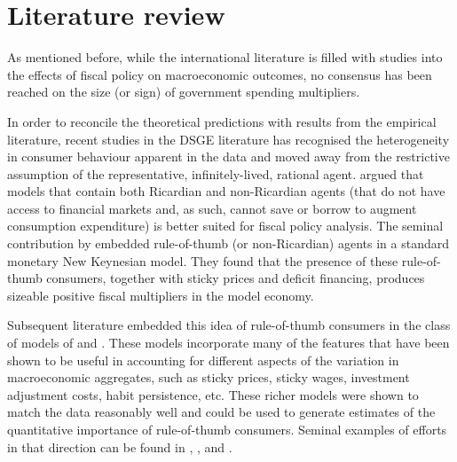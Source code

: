\documentclass[a4paper,11pt]{article}
\numberwithin{equation}{section}
\begin{document}
	
	\section{Literature review} \label{lit_rev}
	
	As mentioned before, while the international literature is filled with studies into the effects of fiscal policy on macroeconomic outcomes, no consensus has been reached on the size (or sign) of government spending multipliers. 
	
	In order to reconcile the theoretical predictions with results from the empirical literature, recent studies in the DSGE literature has recognised the heterogeneity in consumer behaviour apparent in the data and moved away from the restrictive assumption of the representative, infinitely-lived, rational agent. \cite{mankiw} argued that models that contain both Ricardian and non-Ricardian agents (that do not have access to financial markets and, as such, cannot save or borrow to augment consumption expenditure) is better suited for fiscal policy analysis. The seminal contribution by \cite{gali} embedded rule-of-thumb (or non-Ricardian) agents in a standard monetary New Keynesian model. They found that the presence of these rule-of-thumb consumers, together with sticky prices and deficit financing, produces sizeable positive fiscal multipliers in the model economy.
	
	Subsequent literature embedded this idea of rule-of-thumb consumers in the class of models of \cite{smets2005,smets2007} and \cite{christiano2005}. These models incorporate many of the features that have been shown to be useful in accounting for different aspects of the variation in macroeconomic aggregates, such as sticky prices, sticky wages, investment adjustment costs, habit persistence, etc. These richer models were shown to match the data reasonably well and could be used to generate estimates of the quantitative importance of rule-of-thumb consumers. Seminal examples of efforts in that direction can be found in \cite{coenen2005}, \cite{erceg2006}, \cite{rabanal2006} and \cite{forni2009}. 
	
	
\end{document}
